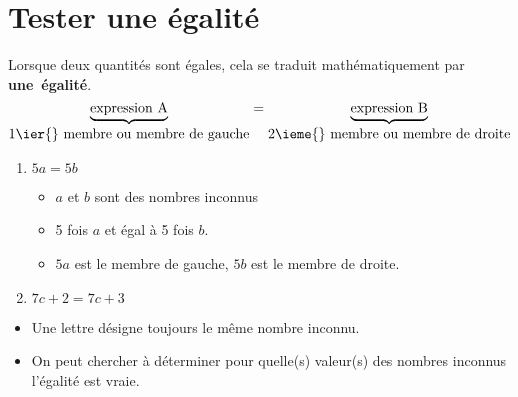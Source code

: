\section{Tester une égalité}
\vspace*{-5mm}
\begin{definition}
    Lorsque deux quantités sont égales, cela se traduit mathématiquement par \mbox{\textbf{une égalité}}.
    $$\underbrace{\mbox{expression A}}_{\mbox{1\ier{} membre ou membre de gauche}}=\underbrace{\mbox{expression B}}_{\mbox{2\ieme{} membre ou membre de droite}}$$
\end{definition}
\begin{exemple*1}
    \begin{enumerate}
        \item $5a=5b$ 
        \begin{itemize}
            \item $a$ et $b$ sont des nombres inconnus
            \item 5 fois $a$ et égal à 5 fois $b$.
            \item $5a$ est le membre de gauche, $5b$ est le membre de droite.
        \end{itemize}
        \item $7c+2=7c+3$
    \end{enumerate}
    \vspace*{-5mm}
\end{exemple*1}
\begin{changemargin}{0mm}{-10mm}
\begin{remarque}
    \begin{itemize}
        \item Une lettre désigne toujours le même nombre inconnu.
        \item On peut chercher à déterminer pour quelle(s) valeur(s) des nombres inconnus l'égalité est vraie.
    \end{itemize}
\end{remarque}
\end{changemargin}
\vspace*{-10mm}
